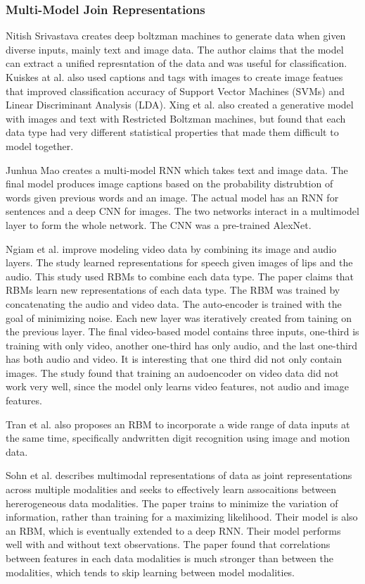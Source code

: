 \subsubsection{Multi-Model Join Representations}
Nitish Srivastava creates deep boltzman machines to generate data when given diverse inputs, mainly text and image data.  The author claims that the model can extract a unified represntation of the data and was useful for classification.  Kuiskes at al. also used captions and tags with images to create image featues that improved classification accuracy of Support Vector Machines (SVMs) and Linear Discriminant Analysis (LDA).  Xing et al. also created a generative model with images and text with Restricted Boltzman machines, but found that each data type had very different statistical properties that made them difficult to model together.

Junhua Mao creates a multi-model RNN which takes text and image data.  The final model produces image captions based on the probability distrubtion of words given previous words and an image.  The actual model has an RNN for sentences and a deep CNN for images.  The two networks interact in a multimodel layer to form the whole network.  The CNN was a pre-trained AlexNet.

Ngiam et al. improve modeling video data by combining its image and audio layers.  The study learned representations for speech given images of lips and the audio.  This study used RBMs to combine each data type.  The paper claims that RBMs learn new representations of each data type.  The RBM was trained by concatenating the audio and video data.  The auto-encoder is trained with the goal of minimizing noise.  Each new layer was iteratively created from taining on the previous layer.  The final video-based model contains three inputs, one-third is training with only video, another one-third has only audio, and the last one-third has both audio and video.  It is interesting that one third did not only contain images.  The study found that training an audoencoder on video data did not work very well, since the model only learns video features, not audio and image features.

Tran et al. also proposes an RBM to incorporate a wide range of data inputs at the same time, specifically andwritten digit recognition using image and motion data.

Sohn et al. describes multimodal representations of data as joint representations across multiple modalities and seeks to effectively learn assocaitions between hererogeneous data modalities. The paper trains to minimize the variation of information, rather than training for a maximizing likelihood.  Their model is also an RBM, which is eventually extended to a deep RNN.  Their model performs well with and without text observations.  The paper found that correlations between features in each data modalities is much stronger than between the modalities, which tends to skip learning between model modalities.




























